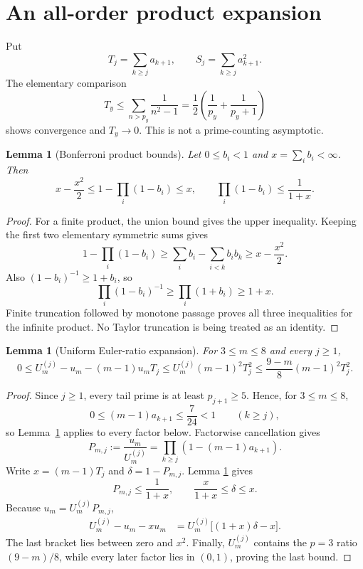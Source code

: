 \documentclass[11pt]{article}
\newtheorem{lemma}[theorem]{Lemma}
\theoremstyle{definition}
\theoremstyle{remark}
\begin{document}
\section{An all-order product expansion}

Put
\begin{equation}
 T_j=\sum_{k\ge j}a_{k+1},\qquad
 S_j=\sum_{k\ge j}a_{k+1}^2.
 \label{eq:tails}
\end{equation}
The elementary comparison
\[
 T_y\le\sum_{n>p_y}\frac1{n^2-1}
 =\frac12\left(\frac1{p_y}+\frac1{p_y+1}\right)
\]
shows convergence and $T_y\to0$.  This is not a prime-counting asymptotic.

\begin{lemma}[Bonferroni product bounds]
\label{lem:bonferroni}
Let $0\le b_i<1$ and $x=\sum_i b_i<\infty$.  Then
\begin{equation}
 x-\frac{x^2}{2}\le1-\prod_i(1-b_i)\le x,
 \qquad
 \prod_i(1-b_i)\le\frac1{1+x}.
 \label{eq:bonferroni}
\end{equation}
\end{lemma}

\begin{proof}
For a finite product, the union bound gives the upper inequality.  Keeping
the first two elementary symmetric sums gives
\[
 1-\prod_i(1-b_i)\ge \sum_i b_i-\sum_{i<k}b_ib_k
 \ge x-\frac{x^2}{2}.
\]
Also $(1-b_i)^{-1}\ge1+b_i$, so
\[
 \prod_i(1-b_i)^{-1}\ge\prod_i(1+b_i)\ge1+x.
\]
Finite truncation followed by monotone passage proves all three inequalities
for the infinite product.  No Taylor truncation is being treated as an
identity.
\end{proof}

\begin{lemma}[Uniform Euler-ratio expansion]
\label{lem:ratio-expansion}
For $3\le m\le8$ and every $j\ge1$,
\begin{equation}
 0\le U_m^{(j)}-u_m-(m-1)u_mT_j
 \le U_m^{(j)}(m-1)^2T_j^2
 \le\frac{9-m}{8}(m-1)^2T_j^2.
 \label{eq:ratio-expansion}
\end{equation}
\end{lemma}

\begin{proof}
Since $j\ge1$, every tail prime is at least $p_{j+1}\ge5$.  Hence, for
$3\le m\le8$,
\[
 0\le (m-1)a_{k+1}\le\frac7{24}<1\qquad(k\ge j),
\]
so Lemma~\ref{lem:bonferroni} applies to every factor below.
Factorwise cancellation gives
\begin{equation}
 P_{m,j}:=\frac{u_m}{U_m^{(j)}}
 =\prod_{k\ge j}\left(1-(m-1)a_{k+1}\right).
 \label{eq:P-tail}
\end{equation}
Write $x=(m-1)T_j$ and $\delta=1-P_{m,j}$.  Lemma
\ref{lem:bonferroni} gives
\[
 P_{m,j}\le\frac1{1+x},\qquad \frac{x}{1+x}\le\delta\le x.
\]
Because $u_m=U_m^{(j)}P_{m,j}$,
\begin{align*}
 U_m^{(j)}-u_m-xu_m
 &=U_m^{(j)}\bigl[(1+x)\delta-x\bigr].
\end{align*}
The last bracket lies between zero and $x^2$.  Finally,
$U_m^{(j)}$ contains the $p=3$ ratio $(9-m)/8$, while every later factor
lies in $(0,1)$, proving the last bound.
\end{proof}
\end{document}
